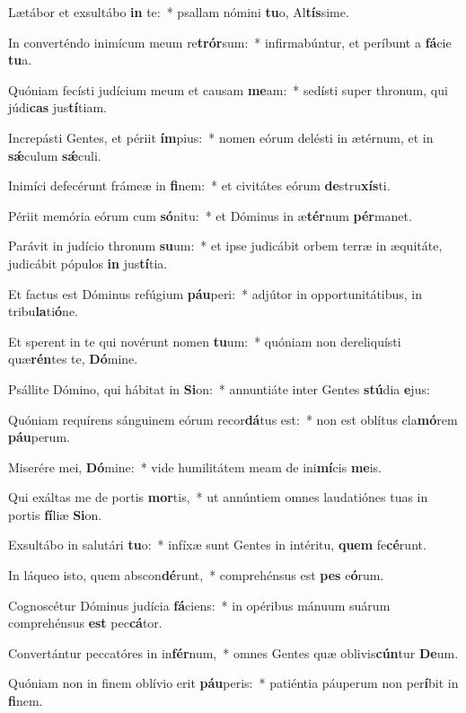 \item Lætábor et exsultábo \textbf{in} te:~* psallam nómini \textbf{tu}o, Al\textbf{tís}sime.
\item In converténdo inimícum meum re\textbf{trór}sum:~* infirmabúntur, et períbunt a \textbf{fá}cie \textbf{tu}a.
\item Quóniam fecísti judícium meum et causam \textbf{me}am:~* sedísti super thronum, qui júdi\textbf{cas} jus\textbf{tí}tiam.
\item Increpásti Gentes, et périit \textbf{ím}pius:~* nomen eórum delésti in ætérnum, et in \textbf{sǽ}culum \textbf{sǽ}culi.
\item Inimíci defecérunt frámeæ in \textbf{fi}nem:~* et civitátes eórum \textbf{de}stru\textbf{xís}ti.
\item Périit memória eórum cum \textbf{só}nitu:~* et Dóminus in æ\textbf{tér}num \textbf{pér}manet.
\item Parávit in judício thronum \textbf{su}um:~* et ipse judicábit orbem terræ in æquitáte, judicábit pópulos \textbf{in} jus\textbf{tí}tia.
\item Et factus est Dóminus refúgium \textbf{páu}peri:~* adjútor in opportunitátibus, in tribu\textbf{la}ti\textbf{ó}ne.
\item Et sperent in te qui novérunt nomen \textbf{tu}um:~* quóniam non dereliquísti quæ\textbf{rén}tes te, \textbf{Dó}mine.
\item Psállite Dómino, qui hábitat in \textbf{Si}on:~* annuntiáte inter Gentes \textbf{stú}dia \textbf{e}jus:
\item Quóniam requírens sánguinem eórum recor\textbf{dá}tus est:~* non est oblítus cla\textbf{mó}rem \textbf{páu}perum.
\item Miserére mei, \textbf{Dó}mine:~* vide humilitátem meam de ini\textbf{mí}cis \textbf{me}is.
\item Qui exáltas me de portis \textbf{mor}tis,~* ut annúntiem omnes laudatiónes tuas in portis \textbf{fí}liæ \textbf{Si}on.
\item Exsultábo in salutári \textbf{tu}o:~* infíxæ sunt Gentes in intéritu, \textbf{quem} fe\textbf{cé}runt.
\item In láqueo isto, quem abscon\textbf{dé}runt,~* comprehénsus est \textbf{pes} e\textbf{ó}rum.
\item Cognoscétur Dóminus judícia \textbf{fá}ciens:~* in opéribus mánuum suárum comprehénsus \textbf{est} pec\textbf{cá}tor.
\item Convertántur peccatóres in in\textbf{fér}num,~* omnes Gentes quæ oblivis\textbf{cún}tur \textbf{De}um.
\item Quóniam non in finem oblívio erit \textbf{páu}peris:~* patiéntia páuperum non per\textbf{í}bit in \textbf{fi}nem.
